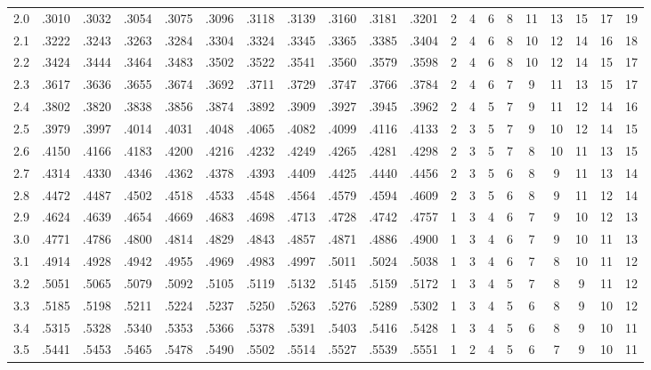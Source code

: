 {\begin{tabular}{|c|cccccccccc|ccccccccc|}
2.0 & .3010 & .3032 & .3054 & .3075 & .3096 & .3118 & .3139 & .3160 & .3181 & .3201 & 2 & 4 & 6 & 8 & 11 & 13 & 15 & 17 & 19 \\
2.1 & .3222 & .3243 & .3263 & .3284 & .3304 & .3324 & .3345 & .3365 & .3385 & .3404 & 2 & 4 & 6 & 8 & 10 & 12 & 14 & 16 & 18 \\
2.2 & .3424 & .3444 & .3464 & .3483 & .3502 & .3522 & .3541 & .3560 & .3579 & .3598 & 2 & 4 & 6 & 8 & 10 & 12 & 14 & 15 & 17 \\
2.3 & .3617 & .3636 & .3655 & .3674 & .3692 & .3711 & .3729 & .3747 & .3766 & .3784 & 2 & 4 & 6 & 7 & 9 & 11 & 13 & 15 & 17 \\
2.4 & .3802 & .3820 & .3838 & .3856 & .3874 & .3892 & .3909 & .3927 & .3945 & .3962 & 2 & 4 & 5 & 7 & 9 & 11 & 12 & 14 & 16 \\
2.5 & .3979 & .3997 & .4014 & .4031 & .4048 & .4065 & .4082 & .4099 & .4116 & .4133 & 2 & 3 & 5 & 7 & 9 & 10 & 12 & 14 & 15 \\
2.6 & .4150 & .4166 & .4183 & .4200 & .4216 & .4232 & .4249 & .4265 & .4281 & .4298 & 2 & 3 & 5 & 7 & 8 & 10 & 11 & 13 & 15 \\
2.7 & .4314 & .4330 & .4346 & .4362 & .4378 & .4393 & .4409 & .4425 & .4440 & .4456 & 2 & 3 & 5 & 6 & 8 & 9 & 11 & 13 & 14 \\
2.8 & .4472 & .4487 & .4502 & .4518 & .4533 & .4548 & .4564 & .4579 & .4594 & .4609 & 2 & 3 & 5 & 6 & 8 & 9 & 11 & 12 & 14 \\
2.9 & .4624 & .4639 & .4654 & .4669 & .4683 & .4698 & .4713 & .4728 & .4742 & .4757 & 1 & 3 & 4 & 6 & 7 & 9 & 10 & 12 & 13 \\
3.0 & .4771 & .4786 & .4800 & .4814 & .4829 & .4843 & .4857 & .4871 & .4886 & .4900 & 1 & 3 & 4 & 6 & 7 & 9 & 10 & 11 & 13 \\
3.1 & .4914 & .4928 & .4942 & .4955 & .4969 & .4983 & .4997 & .5011 & .5024 & .5038 & 1 & 3 & 4 & 6 & 7 & 8 & 10 & 11 & 12 \\
3.2 & .5051 & .5065 & .5079 & .5092 & .5105 & .5119 & .5132 & .5145 & .5159 & .5172 & 1 & 3 & 4 & 5 & 7 & 8 & 9 & 11 & 12 \\
3.3 & .5185 & .5198 & .5211 & .5224 & .5237 & .5250 & .5263 & .5276 & .5289 & .5302 & 1 & 3 & 4 & 5 & 6 & 8 & 9 & 10 & 12 \\
3.4 & .5315 & .5328 & .5340 & .5353 & .5366 & .5378 & .5391 & .5403 & .5416 & .5428 & 1 & 3 & 4 & 5 & 6 & 8 & 9 & 10 & 11 \\
3.5 & .5441 & .5453 & .5465 & .5478 & .5490 & .5502 & .5514 & .5527 & .5539 & .5551 & 1 & 2 & 4 & 5 & 6 & 7 & 9 & 10 & 11 \\

\end{tabular}}
